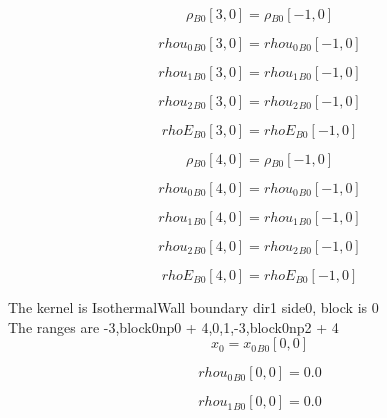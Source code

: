 \documentclass{article}
\begin{document}
\begin{dmath}{\rho{_{B0}}}[{3,0}] = {\rho{_{B0}}}[{-1,0}]\end{dmath}

\begin{dmath}{rhou_{0}{_{B0}}}[{3,0}] = {rhou_{0}{_{B0}}}[{-1,0}]\end{dmath}

\begin{dmath}{rhou_{1}{_{B0}}}[{3,0}] = {rhou_{1}{_{B0}}}[{-1,0}]\end{dmath}

\begin{dmath}{rhou_{2}{_{B0}}}[{3,0}] = {rhou_{2}{_{B0}}}[{-1,0}]\end{dmath}

\begin{dmath}{rhoE{_{B0}}}[{3,0}] = {rhoE{_{B0}}}[{-1,0}]\end{dmath}

\begin{dmath}{\rho{_{B0}}}[{4,0}] = {\rho{_{B0}}}[{-1,0}]\end{dmath}

\begin{dmath}{rhou_{0}{_{B0}}}[{4,0}] = {rhou_{0}{_{B0}}}[{-1,0}]\end{dmath}

\begin{dmath}{rhou_{1}{_{B0}}}[{4,0}] = {rhou_{1}{_{B0}}}[{-1,0}]\end{dmath}

\begin{dmath}{rhou_{2}{_{B0}}}[{4,0}] = {rhou_{2}{_{B0}}}[{-1,0}]\end{dmath}

\begin{dmath}{rhoE{_{B0}}}[{4,0}] = {rhoE{_{B0}}}[{-1,0}]\end{dmath}

\noindent The kernel is IsothermalWall boundary dir1 side0, block is 0\\\noindent The ranges are -3,block0np0 + 4,0,1,-3,block0np2 + 4\\\begin{dmath}x_{0} = {x_{0}{_{B0}}}[{0,0}]\end{dmath}

\begin{dmath}{rhou_{0}{_{B0}}}[{0,0}] = 0.0\end{dmath}

\begin{dmath}{rhou_{1}{_{B0}}}[{0,0}] = 0.0\end{dmath}
\end{document}
